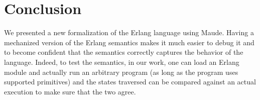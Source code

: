 \documentclass{article}[12pt,a4paper]
\theoremstyle{definition}
\begin{document}







\section{Conclusion}\label{sec:conclusion}
We presented a new formalization of the Erlang language using Maude.
Having a mechanized version of the Erlang semantics makes it much easier to
debug it and to become confident that the semantics correctly captures the
behavior of the language. Indeed, to test the semantics, in our work, one can
load an Erlang module and actually run an arbitrary program (as long as
the program uses supported primitives) and the states traversed can be
compared against an actual execution to make sure that the two agree.
\end{document}
